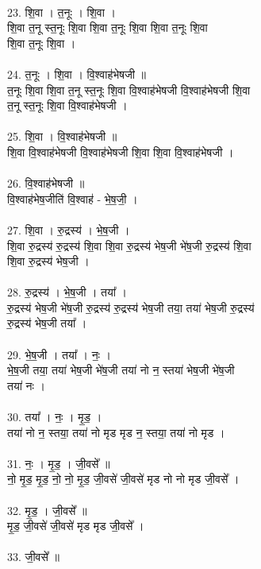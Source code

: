 \\
23. शि॒वा । त॒नूः । शि॒वा ।\\
शि॒वा त॒नू स्त॒नूः शि॒वा शि॒वा त॒नूः शि॒वा शि॒वा त॒नूः शि॒वा\\
शि॒वा त॒नूः शि॒वा ।\\
\\
24. त॒नूः । शि॒वा । वि॒श्वाह॑भेषजी ॥\\
त॒नूः शि॒वा शि॒वा त॒नू स्त॒नूः शि॒वा वि॒श्वाह॑भेषजी वि॒श्वाह॑भेषजी शि॒वा\\
त॒नू स्त॒नूः शि॒वा वि॒श्वाह॑भेषजी ।\\
\\
25. शि॒वा । वि॒श्वाह॑भेषजी ॥\\
शि॒वा वि॒श्वाह॑भेषजी वि॒श्वाह॑भेषजी शि॒वा शि॒वा वि॒श्वाह॑भेषजी ।\\
\\
26. वि॒श्वाह॑भेषजी ॥\\
वि॒श्वाह॑भेष॒जीति॑ वि॒श्वाह॑ - भे॒ष॒जी॒ ।\\
\\
27. शि॒वा । रु॒द्रस्य॑ । भे॒ष॒जी ।\\
शि॒वा रु॒द्रस्य॑ रु॒द्रस्य॑ शि॒वा शि॒वा रु॒द्रस्य॑ भेष॒जी भे॑ष॒जी रु॒द्रस्य॑ शि॒वा\\
शि॒वा रु॒द्रस्य॑ भेष॒जी ।\\
\\
28. रु॒द्रस्य॑ । भे॒ष॒जी । तया᳚ ।\\
रु॒द्रस्य॑ भेष॒जी भे॑ष॒जी रु॒द्रस्य॑ रु॒द्रस्य॑ भेष॒जी तया॒ तया॑ भेष॒जी रु॒द्रस्य॑\\
रु॒द्रस्य॑ भेष॒जी तया᳚ ।\\
\\
29. भे॒ष॒जी । तया᳚ । नः॒ ।\\
भे॒ष॒जी तया॒ तया॑ भेष॒जी भे॑ष॒जी तया॑ नो न॒ स्तया॑ भेष॒जी भे॑ष॒जी\\
तया॑ नः ।\\
\\
30. तया᳚ । नः॒ । मृ॒ड॒ ।\\
तया॑ नो न॒ स्तया॒ तया॑ नो मृड मृड न॒ स्तया॒ तया॑ नो मृड ।\\
\\
31. नः॒ । मृ॒ड॒ । जी॒वसे᳚ ॥\\
नो॒ मृ॒ड॒ मृ॒ड॒ नो॒ नो॒ मृ॒ड॒ जी॒वसे॑ जी॒वसे॑ मृड नो नो मृड जी॒वसे᳚ ।\\
\\
32. मृ॒ड॒ । जी॒वसे᳚ ॥\\
मृ॒ड॒ जी॒वसे॑ जी॒वसे॑ मृड मृड जी॒वसे᳚ ।\\
\\
33. जी॒वसे᳚ ॥\\
